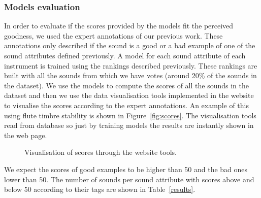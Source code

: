 \documentclass{article}
\begin{document}
\subsubsection{Models evaluation}
In order to evaluate if the scores provided by the models fit the perceived goodness, we used the expert annotations of our previous work. These annotations only described if the sound is a good or a bad example of one of the sound attributes defined previously. A model for each sound attribute of each instrument is trained using the rankings described previously. These rankings are built with all the sounds from which we have votes (around 20\% of the sounds in the dataset). We use the models to compute the scores of all the sounds in the dataset and then we use the data visualisation tools implemented in the website to visualise the scores according to the expert annotations. An example of this using flute timbre stability is shown in Figure~\ref{fig:scores}. The visualisation tools read from database so just by training models the results are instantly shown in the web page. 

\begin{figure}
 \centerline{}
 \caption{Visualisation of scores through the website tools.}
 \label{fig:scores_3}
\end{figure}

We expect the scores of good examples to be higher than 50 and the bad ones lower than 50. The number of sounds per sound attribute with scores above and below 50 according to their tags are shown in Table~\ref{results}.
\end{document}
